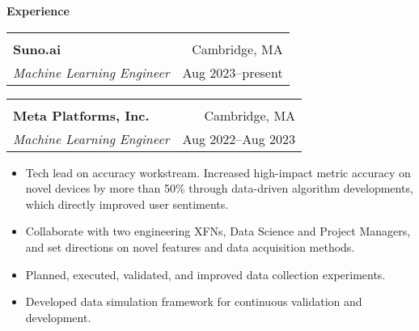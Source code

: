 \documentclass[letterpaper,11pt,oneside]{article}
\begin{document}
 \vspace{-0.35cm}
 \raggedright
 \textbf{\Large{Experience}} \sout{\hfill} \\
 \normalsize  
\begin{flushleft}
 \vspace{-0.45cm}
 \begin{tabular}{@{} l r@{} }
    \hspace{0.78\linewidth} & \hspace{0.2\linewidth} \\
    \textbf{Suno.ai} & Cambridge, MA \\ 
    \textit{Machine Learning Engineer} & Aug 2023--present \\ 
 \end{tabular}
 \end{flushleft}
\begin{flushleft}
 \vspace{-0.45cm}
 \begin{tabular}{@{} l r@{} }
    \hspace{0.78\linewidth} & \hspace{0.2\linewidth} \\
    \textbf{Meta Platforms, Inc.} & Cambridge, MA \\ 
    \textit{Machine Learning Engineer} & Aug 2022--Aug 2023 \\ 
 \end{tabular}
 \end{flushleft}
 \begin{flushleft}
 \begin{small}
 \begin{itemize}[leftmargin=*]
 \item Tech lead on accuracy workstream. Increased high-impact metric accuracy on novel devices by more than 50\% through data-driven algorithm developments, which directly improved user sentiments.
 \item Collaborate with two engineering XFNs, Data Science and Project Managers, and set directions on novel features and data acquisition methods.
 \item  Planned, executed, validated, and improved data collection experiments. 
 \item Developed data simulation framework for continuous validation and development.
 \end{itemize}
 \end{small}
 \end{flushleft}
\end{document}
